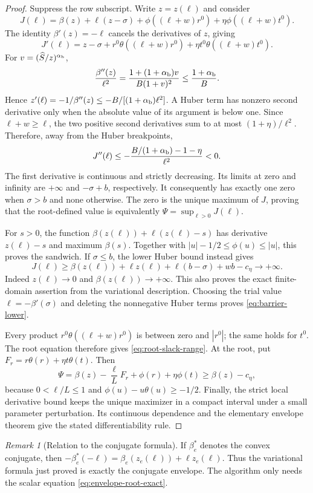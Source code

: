\documentclass[11pt]{article}
\theoremstyle{definition}\newtheorem{definition}[theorem]{Definition}
\theoremstyle{remark}\newtheorem{remark}[theorem]{Remark}
\begin{document}
\begin{proof}
Suppress the row subscript.  Write $z=z(\ell)$ and consider
\[
 J(\ell)=\beta(z)+\ell(z-\sigma)
       +\phi((\ell+w)r^0)+\eta\phi((\ell+w)t^0).
\]
The identity $\beta'(z)=-\ell$ cancels the derivatives of $z$, giving
\[
 J'(\ell)=z-\sigma+r^0\theta((\ell+w)r^0)
                         +\eta t^0\theta((\ell+w)t^0).
\]
For $v=(\widehat S/z)^{\alpha_{\rm b}}$,
\[
 \frac{\beta''(z)}{\ell^2}
   =\frac{1+(1+\alpha_{\rm b})v}{B(1+v)^2}
   \le\frac{1+\alpha_{\rm b}}B.
\]
Hence $z'(\ell)=-1/\beta''(z)\le-B/[(1+\alpha_{\rm b})\ell^2]$.
A Huber term has nonzero second derivative only when the absolute
value of its argument is below one.  Since $\ell+w\ge\ell$, the
two positive second derivatives sum to at most $(1+\eta)/\ell^2$.
Therefore, away from the Huber breakpoints,
\[
 J''(\ell)\le-
 \frac{B/(1+\alpha_{\rm b})-1-\eta}{\ell^2}<0.
\]
The first derivative is continuous and strictly decreasing.  Its limits
at zero and infinity are $+\infty$ and $-\sigma+b$, respectively.
It consequently has exactly one zero when $\sigma>b$ and none otherwise.
The zero is the unique maximum of $J$, proving that the root-defined
value is equivalently $\Psi=\sup_{\ell>0}J(\ell)$.

For $s>0$, the function $\beta(z(\ell))+\ell(z(\ell)-s)$ has
derivative $z(\ell)-s$ and maximum $\beta(s)$.  Together with
$|u|-1/2\le\phi(u)\le|u|$, this proves the sandwich.
If $\sigma\le b$, the lower Huber bound instead gives
\[
 J(\ell)\ge\beta(z(\ell))+\ell z(\ell)
                    +\ell(b-\sigma)+wb-c_\eta\longrightarrow+\infty.
\]
Indeed $z(\ell)\to0$ and $\beta(z(\ell))\to+\infty$.
This also proves the exact finite-domain assertion from the variational
description.  Choosing the trial value $\ell=-\beta'(\sigma)$ and
deleting the nonnegative Huber terms proves \eqref{eq:barrier-lower}.

Every product $r^0\theta((\ell+w)r^0)$ is between zero and $|r^0|$;
the same holds for $t^0$.  The root equation therefore gives
\eqref{eq:root-slack-range}.  At the root, put
$F_r=r\theta(r)+\eta t\theta(t)$.  Then
\[
 \Psi=\beta(z)-\frac\ell L F_r+\phi(r)+\eta\phi(t)
       \ge\beta(z)-c_\eta,
\]
because $0<\ell/L\le1$ and $\phi(u)-u\theta(u)\ge-1/2$.
Finally, the strict local derivative bound keeps the unique maximizer
in a compact interval under a small parameter perturbation.  Its
continuous dependence and the elementary envelope theorem give the
stated differentiability rule.
\end{proof}

\begin{remark}[Relation to the conjugate formula]
If $\beta_e^*$ denotes the convex conjugate, then
$-\beta_e^*(-\ell)=\beta_e(z_e(\ell))+\ell z_e(\ell)$.
Thus the variational formula just proved is exactly the conjugate
envelope.  The algorithm only needs the scalar equation
\eqref{eq:envelope-root-exact}.
\end{remark}
\end{document}
